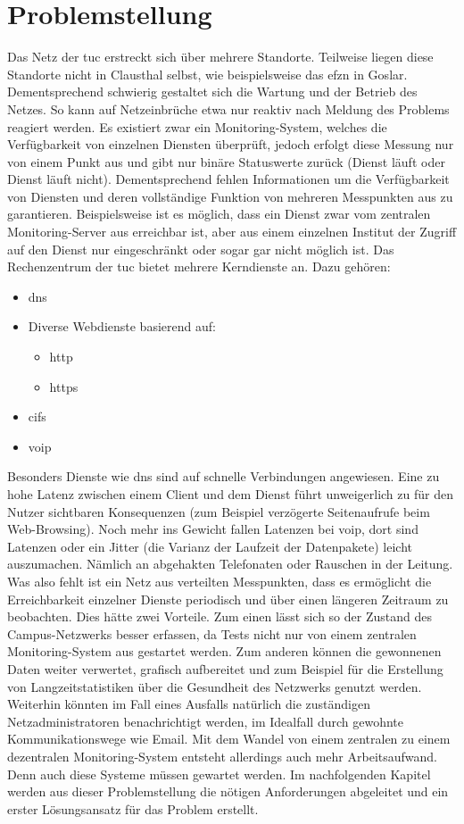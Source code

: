 \documentclass[titlepage]{report}
\begin{document}
\chapter*{Problemstellung}
Das Netz der \gls{tuc} erstreckt sich über mehrere
Standorte. Teilweise liegen diese Standorte nicht in Clausthal
selbst, wie beispielsweise das \gls{efzn} in Goslar. Dementsprechend
schwierig gestaltet sich die Wartung und der Betrieb
des Netzes. So kann auf Netzeinbrüche etwa nur reaktiv
nach Meldung des Problems reagiert werden. Es existiert
zwar ein Monitoring-System, welches die Verfügbarkeit von
einzelnen Diensten überprüft, jedoch erfolgt diese Messung
nur von einem Punkt aus und gibt nur binäre Statuswerte
zurück (Dienst läuft oder Dienst läuft nicht). Dementsprechend
fehlen Informationen um die Verfügbarkeit von Diensten und
deren vollständige Funktion von mehreren Messpunkten aus
zu garantieren. Beispielsweise ist es möglich, dass ein Dienst
zwar vom zentralen Monitoring-Server aus erreichbar ist, aber
aus einem einzelnen Institut der Zugriff auf den Dienst nur
eingeschränkt oder sogar gar nicht möglich ist. Das Rechenzentrum der
\gls{tuc} bietet mehrere Kerndienste an. Dazu
gehören:
\begin{itemize}
    \item \gls{dns}
    \item Diverse Webdienste basierend auf:
    \begin{itemize}
        \item \gls{http}
        \item \gls{https}
    \end{itemize}
    \item \gls{cifs}
    \item \gls{voip}
\end{itemize}
Besonders Dienste wie \gls{dns} sind auf schnelle
Verbindungen angewiesen. Eine zu hohe Latenz zwischen einem Client und
dem Dienst führt unweigerlich zu für den Nutzer sichtbaren Konsequenzen
(zum Beispiel verzögerte Seitenaufrufe beim Web-Browsing). Noch mehr ins
Gewicht fallen Latenzen bei \gls{voip}, dort sind Latenzen
oder ein Jitter (die Varianz der Laufzeit der Datenpakete\cite{JITTERWIKI})
leicht auszumachen. Nämlich an abgehakten Telefonaten oder Rauschen in
der Leitung. Was also fehlt ist ein Netz aus verteilten Messpunkten,
dass es ermöglicht die Erreichbarkeit einzelner Dienste periodisch und
über einen längeren Zeitraum zu beobachten. Dies hätte zwei Vorteile.
Zum einen lässt sich so der Zustand des Campus-Netzwerks besser
erfassen, da Tests nicht nur von einem zentralen Monitoring-System aus
gestartet werden. Zum anderen können die gewonnenen Daten weiter
verwertet, grafisch aufbereitet und zum Beispiel für die Erstellung von
Langzeitstatistiken über die Gesundheit des Netzwerks genutzt werden.
Weiterhin könnten im Fall eines Ausfalls natürlich die zuständigen
Netzadministratoren benachrichtigt werden, im Idealfall durch gewohnte
Kommunikationswege wie Email. Mit dem Wandel von einem zentralen zu
einem dezentralen Monitoring-System entsteht allerdings auch mehr
Arbeitsaufwand. Denn auch diese Systeme müssen gewartet werden. Im
nachfolgenden Kapitel werden aus dieser Problemstellung die nötigen
Anforderungen abgeleitet und ein erster Lösungsansatz für das Problem
erstellt.
\end{document}
